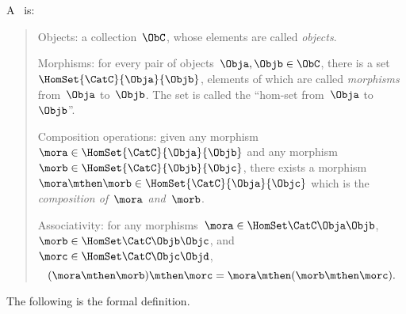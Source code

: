 \section{}



\begin{ctdefinition}[Semicategory]
  \label{def:semicategory}
  A \emph{}~\CatC is:
\begin{quote}
    \constit
  \begin{compactenum}
    \item Objects: a collection\footnotemark~$\ObC$, whose elements are called \emph{objects}.
    \item Morphisms: for every pair of objects~$\Obja,\Objb\in \ObC$, there is a set~$\HomSet{\CatC}{\Obja}{\Objb}$, elements of which are called
    \emph{morphisms} from~$\Obja$ to~$\Objb$. The set is called the ``hom-set from~$\Obja$ to~$\Objb$''.
    \item Composition operations: given any morphism~${\mora} \in  \HomSet{\CatC}{\Obja}{\Objb}$ and any morphism~${\morb} \in \HomSet{\CatC}{\Objb}{\Objc}$, there exists a morphism~$\mora \mthen \morb\in \HomSet{\CatC}{\Obja}{\Objc}$ which is the \emph{composition of~$\mora$ and~$\morb$}.
  \end{compactenum}
 \condit
  \begin{compactenum}
    \item Associativity: for any morphisms~$\mora\in \HomSet\CatC\Obja\Objb$,~$\morb\in \HomSet\CatC\Objb\Objc$, and~$\morc\in \HomSet\CatC\Objc\Objd$,
    \begin{equation}
    (\mora\mthen \morb)
      \mthen \morc= \mora \mthen (\morb \mthen \morc).
    \end{equation}
  \end{compactenum}
  \end{quote}
\end{ctdefinition}



The following is the formal definition.

%
%


